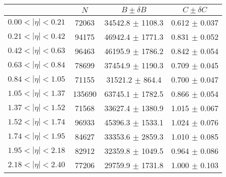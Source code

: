 \begin{tabular}{lccc}
\hline
    &   $N$   & $B \pm \delta B$  &  $C \pm \delta C$ \\
\hline
$0.00 < |\eta| <0.21$          & 72063      & 34542.8    $\pm$ 1108.3 & 0.612      $\pm$ 0.037 \\
$0.21 < |\eta| <0.42$          & 94175      & 46942.4    $\pm$ 1771.3 & 0.831      $\pm$ 0.052 \\
$0.42 < |\eta| <0.63$          & 96463      & 46195.9    $\pm$ 1786.2 & 0.842      $\pm$ 0.054 \\
$0.63 < |\eta| <0.84$          & 78699      & 37454.9    $\pm$ 1190.3 & 0.709      $\pm$ 0.045 \\
$0.84 < |\eta| <1.05$          & 71155      & 31521.2    $\pm$ 864.4 & 0.700      $\pm$ 0.047 \\
$1.05 < |\eta| <1.37$          & 135690     & 63745.1    $\pm$ 1782.5 & 0.866      $\pm$ 0.054 \\
$1.37 < |\eta| <1.52$          & 71568      & 33627.4    $\pm$ 1380.9 & 1.015      $\pm$ 0.067 \\
$1.52 < |\eta| <1.74$          & 96933      & 45396.3    $\pm$ 1533.1 & 1.024      $\pm$ 0.076 \\
$1.74 < |\eta| <1.95$          & 84627      & 33353.6    $\pm$ 2859.3 & 1.010      $\pm$ 0.085 \\
$1.95 < |\eta| <2.18$          & 82912      & 32359.8    $\pm$ 1049.5 & 0.964      $\pm$ 0.086 \\
$2.18 < |\eta| <2.40$          & 77206      & 29759.9    $\pm$ 1731.8 & 1.000      $\pm$ 0.103 \\
\hline
\end{tabular}

